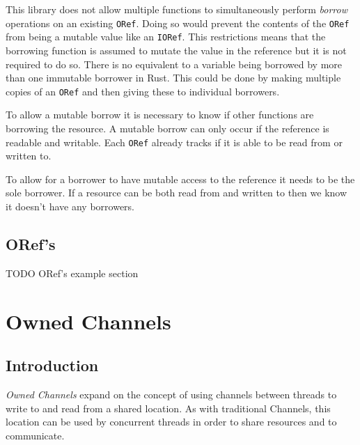 \documentclass[onehalf,11pt]{beavtex}
\begin{document}
This library does not allow multiple functions to simultaneously perform
\textit{borrow} operations on an existing \texttt{ORef}. Doing
so would prevent the contents of the \texttt{ORef} from being a mutable
value like an \texttt{IORef}.  This restrictions means that the borrowing
function is assumed to mutate the value in the reference but it is not
required to do so.
There is no equivalent to a variable being borrowed by more than one immutable
borrower in Rust.
This could be done by making multiple copies of an \texttt{ORef} and
then giving these to individual borrowers.


To allow a mutable borrow it is necessary to know if other functions are
borrowing the resource. A mutable borrow can only occur if the reference
is readable and writable.
Each \texttt{ORef} already tracks if it is able to be read from or written to.

To allow for a borrower to have mutable access to the reference it needs to be
the sole borrower. If a resource can be both read from and written to then we
know it doesn't have any borrowers.


\section{ORef's}

TODO ORef's example section




\chapter{Owned Channels}

\section{Introduction}

\textit{Owned Channels} expand on the concept of using channels between threads
to write to and read from a shared location.   As with traditional Channels,
this location can be used by concurrent threads in order to share resources and
to communicate.
\end{document}

